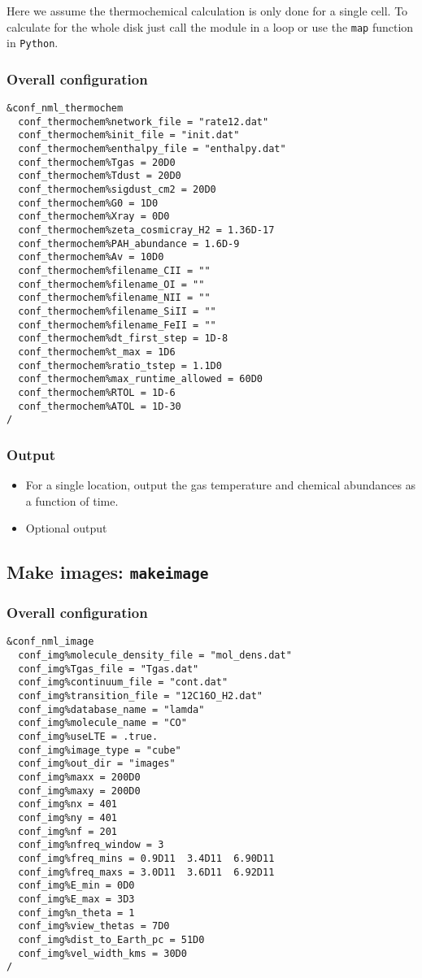 \documentclass{article}
\newcommand{\cds}[1]{\texttt{#1}}
\newcommand{\python}{\texttt{Python}}
\newcommand{\makeimage}{\texttt{makeimage}}
\begin{document}
Here we assume the thermochemical calculation is only done for a single cell.  To calculate for the whole disk just call the module in a loop or use the \cds{map} function in \python.

\subsubsection{Overall configuration}

\begin{lstlisting}
&conf_nml_thermochem
  conf_thermochem%network_file = "rate12.dat"
  conf_thermochem%init_file = "init.dat"
  conf_thermochem%enthalpy_file = "enthalpy.dat"
  conf_thermochem%Tgas = 20D0
  conf_thermochem%Tdust = 20D0
  conf_thermochem%sigdust_cm2 = 20D0
  conf_thermochem%G0 = 1D0
  conf_thermochem%Xray = 0D0
  conf_thermochem%zeta_cosmicray_H2 = 1.36D-17
  conf_thermochem%PAH_abundance = 1.6D-9
  conf_thermochem%Av = 10D0
  conf_thermochem%filename_CII = ""
  conf_thermochem%filename_OI = ""
  conf_thermochem%filename_NII = ""
  conf_thermochem%filename_SiII = ""
  conf_thermochem%filename_FeII = ""
  conf_thermochem%dt_first_step = 1D-8
  conf_thermochem%t_max = 1D6
  conf_thermochem%ratio_tstep = 1.1D0
  conf_thermochem%max_runtime_allowed = 60D0
  conf_thermochem%RTOL = 1D-6
  conf_thermochem%ATOL = 1D-30
/
\end{lstlisting}

\subsubsection{Output}

\begin{itemize}
  \item For a single location, output the gas temperature and chemical abundances as a function of time.
  \item Optional output
\end{itemize}  

\subsection{Make images: \makeimage}

\subsubsection{Overall configuration}

\begin{lstlisting}
&conf_nml_image
  conf_img%molecule_density_file = "mol_dens.dat"
  conf_img%Tgas_file = "Tgas.dat"
  conf_img%continuum_file = "cont.dat"
  conf_img%transition_file = "12C16O_H2.dat"
  conf_img%database_name = "lamda"
  conf_img%molecule_name = "CO"
  conf_img%useLTE = .true.
  conf_img%image_type = "cube"
  conf_img%out_dir = "images"
  conf_img%maxx = 200D0
  conf_img%maxy = 200D0
  conf_img%nx = 401
  conf_img%ny = 401
  conf_img%nf = 201
  conf_img%nfreq_window = 3
  conf_img%freq_mins = 0.9D11  3.4D11  6.90D11
  conf_img%freq_maxs = 3.0D11  3.6D11  6.92D11
  conf_img%E_min = 0D0
  conf_img%E_max = 3D3
  conf_img%n_theta = 1
  conf_img%view_thetas = 7D0
  conf_img%dist_to_Earth_pc = 51D0
  conf_img%vel_width_kms = 30D0
/
\end{lstlisting}
\end{document}
